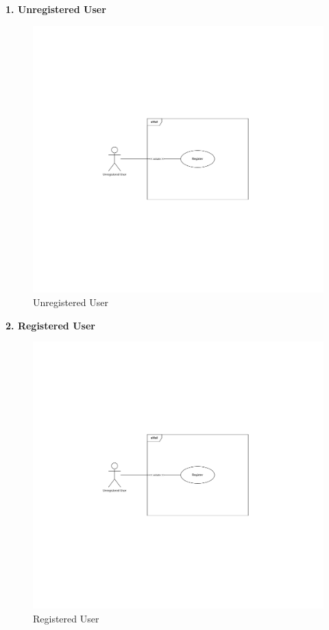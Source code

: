\documentclass[11pt]{article}
\begin{document}
\begin{description}
    \item \textbf{1. Unregistered User}
    \begin{figure}[!ht]
        \centering
        \includegraphics[page={1}, trim=7cm 9.7cm 7cm 9.6cm, width=0.6\linewidth, clip]{UseCases.pdf}
        \caption{Unregistered User}
    \end{figure}
    
    \item \textbf{2. Registered User}
    \begin{figure}[!ht]
        \centering
        \includegraphics[page={2}, trim=0cm 2.8cm 0cm 2.7cm, width=\linewidth, clip]{UseCases.pdf}
        \caption{Registered User}
    \end{figure}
    

\end{description}
\end{document}
